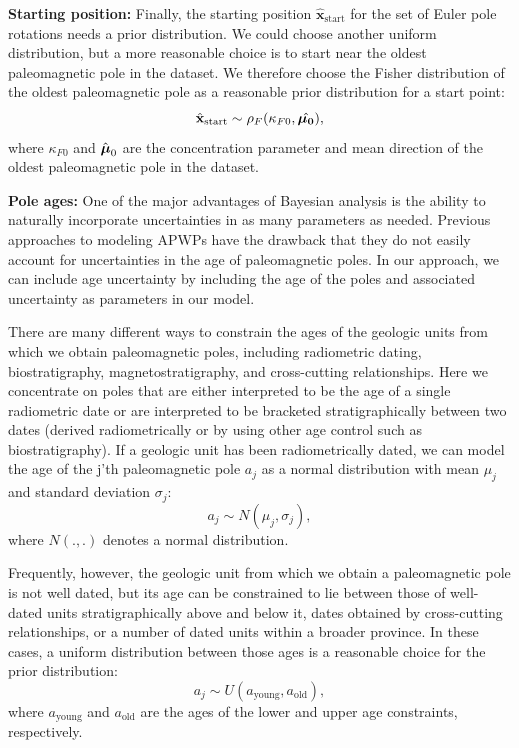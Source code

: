 \documentclass[11pt,letterpaper]{article}
\newcommand{\mitbf}[1]{\hbox{\mathversion{bold}$#1$}}
\begin{document}
\textbf{Starting position:}
Finally, the starting position $\hat{\mathbf{x}}_\mathrm{start}$ for the set of Euler pole rotations needs a prior distribution. We could choose another uniform distribution, but a more reasonable choice is to start near the oldest paleomagnetic pole in the dataset. We therefore choose the Fisher distribution of the oldest paleomagnetic pole as a reasonable prior distribution for a start point:
\begin{equation}
\hat{\mathbf{x}}_\mathrm{start} \sim \rho_F(\kappa_{F0}, \hat{\mitbf{\mu_0}}),
\end{equation}
where $\kappa_{F0}$ and $\hat{\mitbf{\mu}}_0$ are the concentration parameter and mean direction of the oldest paleomagnetic pole in the dataset.

\textbf{Pole ages:}
One of the major advantages of Bayesian analysis is the ability to naturally incorporate uncertainties in as many parameters as needed. Previous approaches to modeling APWPs have the drawback that they do not easily account for uncertainties in the age of paleomagnetic poles. In our approach, we can include age uncertainty by including the age of the poles and associated uncertainty as parameters in our model.

There are many different ways to constrain the ages of the geologic units from which we obtain paleomagnetic poles, including radiometric dating, biostratigraphy, magnetostratigraphy, and cross-cutting relationships. Here we concentrate on poles that are either interpreted to be the age of a single radiometric date or are interpreted to be bracketed stratigraphically between two dates (derived radiometrically or by using other age control such as biostratigraphy). If a geologic unit has been radiometrically dated, we can model the age of the j'th paleomagnetic pole $a_j$ as a normal distribution with mean $\mu_j$ and standard deviation $\sigma_j$:
\begin{equation}
a_j \sim N(\mu_j, \sigma_j),
\end{equation}
where $N(.,.)$ denotes a normal distribution.

Frequently, however, the geologic unit from which we obtain a paleomagnetic pole is not well dated, but its age can be constrained to lie between those of well-dated units stratigraphically above and below it, dates obtained by cross-cutting relationships, or a number of dated units within a broader province. In these cases, a uniform distribution between those ages is a reasonable choice for the prior distribution:
\begin{equation}
a_j \sim U(a_\mathrm{young}, a_\mathrm{old}),
\end{equation}
where $a_\mathrm{young}$ and $a_\mathrm{old}$ are the ages of the lower and upper age constraints, respectively.
\end{document}
